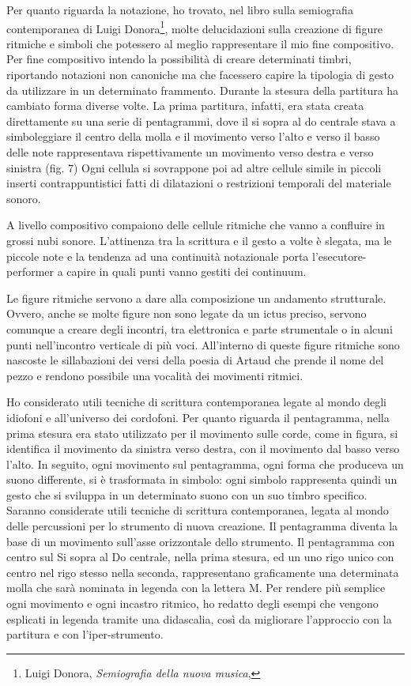 Per quanto riguarda la notazione, ho trovato, nel libro sulla semiografia contemporanea di Luigi Donora\footnote{Luigi Donora, \textit{Semiografia della nuova musica}, }, molte delucidazioni sulla creazione di figure ritmiche e simboli che potessero al meglio rappresentare il mio fine compositivo. Per fine compositivo intendo la possibilità di creare determinati timbri, riportando notazioni non canoniche ma che facessero capire la tipologia di gesto da utilizzare in un determinato frammento. Durante la stesura della partitura ha cambiato forma diverse volte. La prima partitura, infatti, era stata creata direttamente su una serie di pentagrammi, dove il si sopra al do centrale stava a simboleggiare il centro della molla e il movimento verso l'alto e verso il basso delle note rappresentava rispettivamente un movimento verso destra e verso sinistra (fig. 7)
Ogni cellula si sovrappone poi ad altre cellule simile in piccoli inserti contrappuntistici fatti di dilatazioni o restrizioni temporali del materiale sonoro.

A livello compositivo compaiono delle cellule ritmiche che vanno a confluire in grossi nubi sonore. L'attinenza tra la scrittura e il gesto a volte è slegata, ma le piccole note e la tendenza ad una continuità notazionale porta l'esecutore-performer a capire in quali punti vanno gestiti dei continuum.

Le figure ritmiche servono a dare alla composizione un andamento strutturale. Ovvero, anche se molte figure non sono legate da un ictus preciso, servono comunque a creare degli incontri, tra elettronica e parte strumentale o in alcuni punti nell'incontro verticale di più voci. All'interno di queste figure ritmiche sono nascoste le sillabazioni dei versi della poesia di Artaud che prende il nome del pezzo e rendono possibile una vocalità dei movimenti ritmici.

Ho considerato utili tecniche di scrittura contemporanea legate al mondo degli idiofoni e all'universo dei cordofoni. Per quanto riguarda il pentagramma, nella prima stesura era stato utilizzato per il movimento sulle corde, come in figura, si identifica il movimento da sinistra verso destra, con il movimento dal basso verso l'alto. In seguito, ogni movimento sul pentagramma, ogni forma che produceva un suono differente, si è trasformata in simbolo: ogni simbolo rappresenta quindi un gesto che si sviluppa in un determinato suono con un suo timbro specifico.
Saranno considerate utili tecniche di scrittura contemporanea, legata al mondo delle percussioni per lo strumento di nuova creazione. Il pentagramma diventa la base di un movimento sull'asse orizzontale dello strumento. Il pentagramma con centro sul Si sopra al Do centrale, nella prima stesura, ed un uno rigo unico con centro nel rigo stesso nella seconda, rappresentano graficamente una determinata molla che sarà nominata in legenda con la lettera M. Per rendere più semplice ogni movimento e ogni incastro ritmico, ho redatto degli esempi che vengono esplicati in legenda tramite una didascalia, così da migliorare l'approccio con la partitura e con l'iper-strumento.

